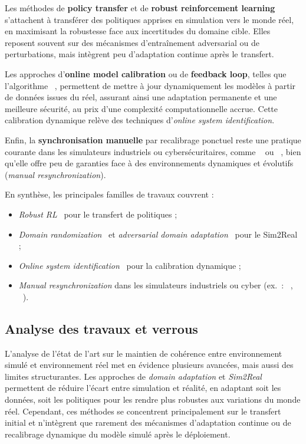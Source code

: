 Les méthodes de \textbf{policy transfer} et de \textbf{robust reinforcement learning}~\cite{pinto2017robust} s'attachent à transférer des politiques apprises en simulation vers le monde réel, en maximisant la robustesse face aux incertitudes du domaine cible. Elles reposent souvent sur des mécanismes d'entraînement adversarial ou de perturbations, mais intègrent peu d'adaptation continue après le transfert.

Les approches d'\textbf{online model calibration} ou de \textbf{feedback loop}, telles que l'algorithme ~\cite{deisenroth2011pilco}, permettent de mettre à jour dynamiquement les modèles à partir de données issues du réel, assurant ainsi une adaptation permanente et une meilleure sécurité, au prix d'une complexité computationnelle accrue. Cette calibration dynamique relève des techniques d'\textit{online system identification}.

Enfin, la \textbf{synchronisation manuelle} par recalibrage ponctuel reste une pratique courante dans les simulateurs industriels ou cybersécuritaires, comme ~\cite{Standen2021} ou \phantom{XXXX} ~\cite{cyberbattlesim}, bien qu'elle offre peu de garanties face à des environnements dynamiques et évolutifs (\textit{manual resynchronization}).

\medskip

En synthèse, les principales familles de travaux couvrent :
\begin{itemize}
  \item \textit{Robust RL}~\cite{pinto2017robust} pour le transfert de politiques ;
  \item \textit{Domain randomization}~\cite{tobin2017domain} et \textit{adversarial domain adaptation}~\cite{ganin2016domain} pour le Sim2Real ;
  \item \textit{Online system identification}~\cite{deisenroth2011pilco} pour la calibration dynamique ;
  \item \textit{Manual resynchronization} dans les simulateurs industriels ou cyber (ex.~: ~\cite{Standen2021}, ~\cite{cyberbattlesim}).
\end{itemize}


\subsection*{Analyse des travaux et verrous}

L'analyse de l'état de l'art sur le maintien de cohérence entre environnement simulé et environnement réel met en évidence plusieurs avancées, mais aussi des limites structurantes. Les approches de \textit{domain adaptation} et \textit{Sim2Real} permettent de réduire l'écart entre simulation et réalité, en adaptant soit les données, soit les politiques pour les rendre plus robustes aux variations du monde réel. Cependant, ces méthodes se concentrent principalement sur le transfert initial et n'intègrent que rarement des mécanismes d'adaptation continue ou de recalibrage dynamique du modèle simulé après le déploiement.

